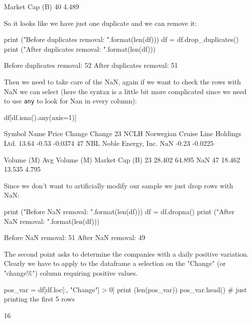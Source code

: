 \begin{solution}
\begin{ioutput}
    Market Cap (B)
40           4.489
\end{ioutput}
        
So it looks like we have just one duplicate and we can remove it:

\begin{ipython}
print ("Before duplicates removal: {}".format(len(df)))
df = df.drop_duplicates()
print ("After duplicates removal: {}".format(len(df)))
\end{ipython}
\begin{ioutput}
Before duplicates removal: 52
After duplicates removal: 51
\end{ioutput}

Then we need to take care of the NaN, again if we want to check the rows with NaN we can select (here the syntax is a little bit more complicated since we need to use \texttt{any} to look for Nan in every column):

\begin{ipython}
df[df.isna().any(axis=1)]
\end{ipython}
\begin{ioutput}
   Symbol                                 Name  Price  Change  Change%
23   NCLH  Norwegian Cruise Line Holdings Ltd.  13.64   -0.53  -0.0374
47    NBL                   Noble Energy, Inc.    NaN   -0.23  -0.0225

    Volume (M)  Avg Volume (M)  Market Cap (B)
23      28.402          64.895             NaN
47      18.462          13.535           4.795
\end{ioutput}
        
Since we don't want to artificially modify our sample we just drop rows with NaN:

\begin{ipython}
print ("Before NaN removal: {}".format(len(df)))
df = df.dropna()
print ("After NaN removal: {}".format(len(df)))
\end{ipython}
\begin{ioutput}
Before NaN removal: 51
After NaN removal: 49
\end{ioutput}

The second point asks to determine the companies with a daily positive variation. Clearly we have to apply to the dataframe a selection on the "Change" (or "change\%") column requiring positive values.

\begin{ipython}
pos_var = df[df.loc[:, "Change"] > 0]
print (len(pos_var))
pos_var.head() # just printing the first 5 rows
\end{ipython}
\begin{ioutput}
16


\end{ioutput}
\end{solution}
